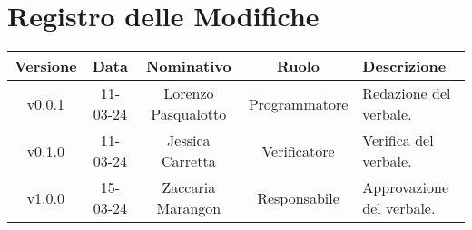 \section*{\Large Registro delle Modifiche}
    \begin{table}[h]
        \centering
        \renewcommand\tabularxcolumn[1]{m{#1}} %
        \renewcommand{\arraystretch}{1.5}
        \begin{tabularx}{0.98\textwidth}
            {c|c|c|c|>{\centering\arraybackslash}X}
            \rowcolor{black}
            \textbf{\color{white} Versione} & \textbf{\color{white} Data} & \textbf{\color{white} Nominativo} & \textbf{\color{white} Ruolo} & \textbf{\color{white} Descrizione} \\ 
            \hline

            v0.0.1 & 11-03-24 & Lorenzo Pasqualotto & Programmatore & Redazione del verbale.\\
            v0.1.0 & 11-03-24 & Jessica Carretta & Verificatore & Verifica del verbale.\\
            v1.0.0 & 15-03-24 & Zaccaria Marangon & Responsabile & Approvazione del verbale.\\
            \hline
        \end{tabularx}
    \end{table}
